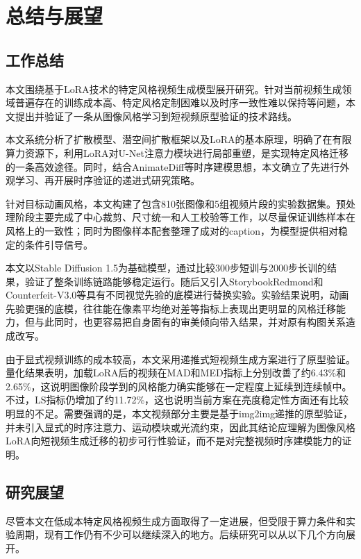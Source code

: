 
\chapter{总结与展望}

\section{工作总结}

本文围绕基于LoRA技术的特定风格视频生成模型展开研究。针对当前视频生成领域普遍存在的训练成本高、特定风格定制困难以及时序一致性难以保持等问题，本文提出并验证了一条从图像风格学习到短视频原型验证的技术路线。

本文系统分析了扩散模型、潜空间扩散框架以及LoRA的基本原理，明确了在有限算力资源下，利用LoRA对U-Net注意力模块进行局部重塑，是实现特定风格迁移的一条高效途径。同时，结合AnimateDiff等时序建模思想，本文确立了先进行外观学习、再开展时序验证的递进式研究策略。

针对目标动画风格，本文构建了包含810张图像和5组视频片段的实验数据集。预处理阶段主要完成了中心裁剪、尺寸统一和人工校验等工作，以尽量保证训练样本在风格上的一致性；同时为图像样本配套整理了成对的caption，为模型提供相对稳定的条件引导信号。

本文以Stable Diffusion 1.5为基础模型，通过比较300步短训与2000步长训的结果，验证了整条训练链路能够稳定运行。随后又引入StorybookRedmond和Counterfeit-V3.0等具有不同视觉先验的底模进行替换实验。实验结果说明，动画先验更强的底模，往往能在像素平均绝对差等指标上表现出更明显的风格迁移能力，但与此同时，也更容易把自身固有的审美倾向带入结果，并对原有构图关系造成改写。

由于显式视频训练的成本较高，本文采用递推式短视频生成方案进行了原型验证。量化结果表明，加载LoRA后的视频在MAD和MED指标上分别改善了约6.43\%和2.65\%，这说明图像阶段学到的风格能力确实能够在一定程度上延续到连续帧中。不过，LS指标仍增加了约11.72\%，这也说明当前方案在亮度稳定性方面还有比较明显的不足。需要强调的是，本文视频部分主要是基于img2img递推的原型验证，并未引入显式的时序注意力、运动模块或光流约束，因此其结论应理解为图像风格LoRA向短视频生成迁移的初步可行性验证，而不是对完整视频时序建模能力的证明。

\section{研究展望}

尽管本文在低成本特定风格视频生成方面取得了一定进展，但受限于算力条件和实验周期，现有工作仍有不少可以继续深入的地方。后续研究可以从以下几个方向展开。

